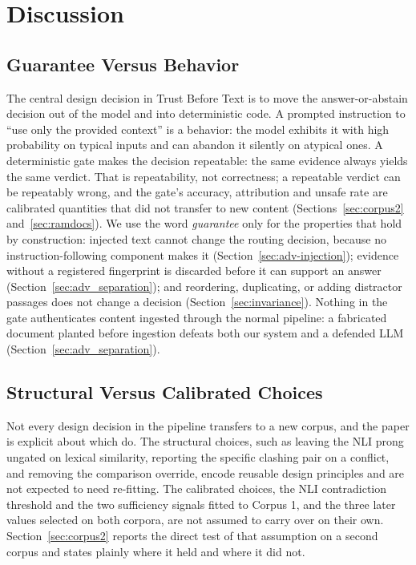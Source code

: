 \documentclass[conference]{IEEEtran}
\begin{document}
\section{Discussion}
\label{sec:discussion}

\subsection{Guarantee Versus Behavior}
The central design decision in Trust Before Text is to move the
answer-or-abstain decision out of the model and into deterministic code. A
prompted instruction to ``use only the provided context'' is a behavior: the
model exhibits it with high probability on typical inputs and can abandon it
silently on atypical ones. A deterministic gate makes the decision
repeatable: the same evidence always yields the same verdict. That is
repeatability, not correctness; a repeatable verdict can be repeatably
wrong, and the gate's accuracy, attribution and unsafe rate are calibrated
quantities that did not transfer to new content
(Sections~\ref{sec:corpus2} and~\ref{sec:ramdocs}). We use the word
\textit{guarantee} only for the properties that hold by construction:
injected text cannot change the routing decision, because no
instruction-following component makes it
(Section~\ref{sec:adv-injection}); evidence without a registered
fingerprint is discarded before it can support an answer
(Section~\ref{sec:adv_separation}); and reordering, duplicating, or adding
distractor passages does not change a decision
(Section~\ref{sec:invariance}). Nothing in the gate authenticates content
ingested through the normal pipeline: a fabricated document planted before
ingestion defeats both our system and a defended LLM
(Section~\ref{sec:adv_separation}).

\subsection{Structural Versus Calibrated Choices}
Not every design decision in the pipeline transfers to a new corpus, and
the paper is explicit about which do. The structural choices, such as
leaving the NLI prong ungated on lexical similarity, reporting the specific
clashing pair on a conflict, and removing the comparison override, encode
reusable design principles and are not expected to need re-fitting. The
calibrated choices, the NLI contradiction threshold and the two sufficiency
signals fitted to Corpus 1, and the three later values selected on both
corpora, are not assumed to carry over on their own.
Section~\ref{sec:corpus2} reports the direct test of that
assumption on a second corpus and states plainly where it held and where it
did not.
\end{document}
